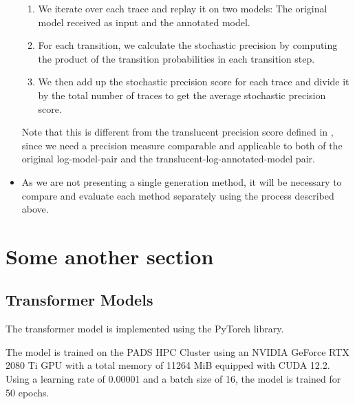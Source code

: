 \begin{itemize}
    \begin{enumerate}
        \item We iterate over each trace and replay it on two models: The original model received as input and the annotated model.
        \item For each transition, we calculate the stochastic precision by computing the product of the transition probabilities in each transition step.
        \item We then add up the stochastic precision score for each trace and divide it by the total number of traces to get the average stochastic precision score.
    \end{enumerate}

    Note that this is different from the translucent precision score defined in \cite{translucent-precision}, since we need a precision measure comparable and applicable to both of the original log-model-pair and the translucent-log-annotated-model pair.

    \item As we are not presenting a single generation method, it will be necessary to compare and evaluate each method separately using the process described above.

\end{itemize}

\section{Some another section}
\subsection{Transformer Models}

The transformer model is implemented using the PyTorch library. 

The model is trained on the PADS HPC Cluster using an NVIDIA GeForce RTX 2080 Ti GPU with a total memory of 11264 MiB equipped with CUDA 12.2. Using a learning rate of 0.00001 and a batch size of 16, the model is trained for 50 epochs.

